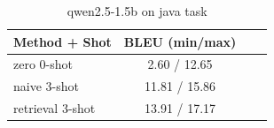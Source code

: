 \begin{table}[ht]
\centering
\small
\caption{qwen2.5-1.5b on java task}
\begin{tabular}{lccc}
\hline
Method + Shot & BLEU (min/max) \\
\hline
zero 0-shot & 2.60 / 12.65 \\
naive 3-shot & 11.81 / 15.86 \\
retrieval 3-shot & 13.91 / 17.17 \\
\hline
\end{tabular}
\end{table}
